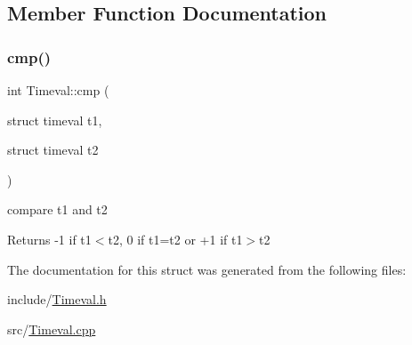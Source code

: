 \subsection{Member Function Documentation}
\mbox{\label{classTimeval_acda4495a9c75a5bb80949942f0ffc4a8}} 
\subsubsection{\texorpdfstring{cmp()}{cmp()}}
{\footnotesize\ttfamily int Timeval\+::cmp (\begin{DoxyParamCaption}\item[{struct timeval}]{t1,  }\item[{struct timeval}]{t2 }\end{DoxyParamCaption})\hspace{0.3cm}{\ttfamily [static]}}



compare t1 and t2 

\begin{DoxyReturn}{Returns}
-\/1 if t1$<$t2, 0 if t1=t2 or +1 if t1$>$t2 
\end{DoxyReturn}


The documentation for this struct was generated from the following files\+:\begin{DoxyCompactItemize}
\item 
include/\hyperlink{Timeval_8h}{Timeval.\+h}\item 
src/\hyperlink{Timeval_8cpp}{Timeval.\+cpp}\end{DoxyCompactItemize}
